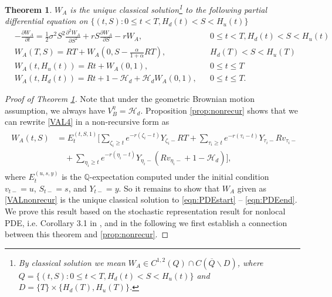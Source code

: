 \documentclass[draft, noinfoline]{ectaart}
\numberwithin{equation}{section}
\theoremstyle{plain}
\newtheorem{theorem}{Theorem}[section]
\begin{document}
\begin{appendices}
\begin{theorem}\label{thm:main}
$W_{A}$ is the unique classical solution\footnote{By classical solution we mean $W_{A}\in C^{1,2}(Q)\cap C(\overline{Q}\backslash D)$, where $Q=\{(t,S):0\le t<T,H_{d}(t)<S<H_{u}(t)\}$ and $D=\{T\}\times\{H_{d}(T),H_{u}(T)\}$.} to the following partial differential equation on $\{(t,S):0\le t<T,H_{d}(t)<S<H_{u}(t)\}$
\begin{align}
&-\frac{\partial W_{A}}{\partial t}  =\frac{1}{2}\sigma^{2}S^{2}\frac{\partial^{2}W_{A}}{\partial S^{2}}+r S\frac{\partial W_{A}}{\partial S}-r W_{A},&&0\le t<T,H_d(t)<S<H_u(t)\\
&W_{A}(T,S)  =RT+W_{A}(0,S-\frac{\alpha}{1+\alpha}RT),&&H_d(T)<S<H_u(T)\\
&W_{A}(t,H_{u}(t))  =Rt+W_{A}(0,1),&&0\le t\le T\\
&W_{A}(t,H_d(t))  =Rt+1-\mathcal{H}_{d}+\mathcal{H}_{d}W_{A}(0,1),&&0\le t\le T.
\end{align}
\end{theorem}

\begin{proof}[Proof of Theorem \ref{thm:main}]
	Note that under the geometric Brownian motion assumption, we always have $V^\eta_B=\mathcal{H}_d$. Proposition \ref{prop:nonrecur} shows that we can rewrite \eqref{VAL4} in a non-recursive form as
	\begin{align*}
	\begin{split}
	W_A(t,S)&=E_t^{(t,S,1)}\Bigg[\sum_{\zeta_i\ge t}e^{-r(\zeta_i-t)}Y_{\zeta_i-}RT+\sum_{\tau_i\ge t}e^{-r(\tau_i-t)}Y_{\tau_i-}Rv_{\tau_i-}\\
	&\quad+\sum_{\eta_i\ge t}e^{-r(\eta_i-t)}Y_{\eta_i-}(Rv_{\eta_i-}+1-\mathcal{H}_d)\Bigg],
	\end{split}
	\end{align*}
	where $E^{(u,s,y)}_t$ is the $\mathbb{Q}$-expectation computed under the initial condition $v_{t-}=u$, $S_{t-}=s$, and $Y_{t-}=y$. So it remains to show that $W_A$ given as \eqref{VALnonrecur} is the unique classical solution to \eqref{eqn:PDEstart} -- \eqref{eqn:PDEend}. We prove this result based on the stochastic representation result for nonlocal PDE, i.e. Corollary 3.1 in \cite{dai_stochastic_2017}, and in the following we first establish a connection between this theorem and \eqref{prop:nonrecur}.


\end{proof}
\end{appendices}
\end{document}
